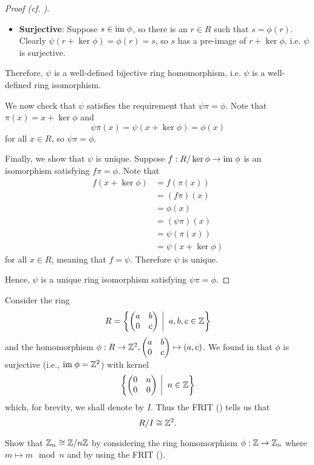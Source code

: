 \begin{proof}[Proof (cf. {\cite[p.~302, Factor Theorem For Rings]{cohn_1982}})]
\begin{itemize}
        \item \textbf{Surjective}: Suppose $s \in \mathrm{im}\;\phi$, so there is an $r \in R$ such that $s = \phi(r)$. Clearly $\psi(r + \ker\phi) = \phi(r) = s$, so $s$ has a pre-image of $r + \ker\phi$, i.e. $\psi$ is surjective.
    \end{itemize}
    Therefore, $\psi$ is a well-defined bijective ring homomorphism, i.e. $\psi$ is a well-defined ring isomorphism.

    We now check that $\psi$ satisfies the requirement that $\psi\pi = \phi$. Note that $\pi(x) = x + \ker\phi$ and
    \[
        \psi\pi(x) = \psi(x + \ker\phi) = \phi(x)
    \]
    for all $x \in R$, so $\psi\pi = \phi$.

    Finally, we show that $\psi$ is unique. Suppose $f: R/\ker\phi \to \mathrm{im}\;\phi$ is an isomorphism satisfying $f\pi=\phi$. Note that
    \begin{align*}
        f(x + \ker\phi) &= f(\pi(x))\\
        &= (f\pi)(x)\\
        &= \phi(x)\\
        &= (\psi\pi)(x)\\
        &= \psi(\pi(x))\\
        &= \psi(x + \ker\phi)
    \end{align*}
    for all $x \in R$, meaning that $f = \psi$. Therefore $\psi$ is unique.

    Hence, $\psi$ is a unique ring isomorphism satisfying $\psi\pi = \phi$.
\end{proof}

\begin{example}
    Consider the ring
    \[
        R = \left\{\begin{pmatrix}a&b\\0&c\end{pmatrix}\vert a,b,c\in\Z\right\}
    \]
    and the homomorphism $\phi: R \to \mathbb{Z}^2, \begin{pmatrix}a&b\\0&c\end{pmatrix} \mapsto (a,c)$. We found in  that $\phi$ is surjective (i.e., $\mathrm{im}\;\phi = \mathbb{Z}^2$) with kernel
    \[
        \left\{\begin{pmatrix}0&n\\0&0\end{pmatrix} \vert n \in \Z\right\}
    \]
    which, for brevity, we shall denote by $I$. Thus the FRIT () tells us that
    \[
        R/I \cong \mathbb{Z}^2.
    \]
\end{example}
\begin{exercise}
    Show that $\mathbb{Z}_n \cong \mathbb{Z}/n\mathbb{Z}$ by considering the ring homomorphism $\phi: \mathbb{Z} \to \mathbb{Z}_n$ where $m \mapsto m \mod n$ and by using the FRIT ().
\end{exercise}


